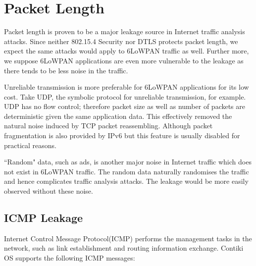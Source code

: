 \section{Packet Length}
Packet length is proven to be a major leakage source in Internet traffic analysis attacks. Since neither 802.15.4 Security nor DTLS protects packet length, we expect the same attacks would apply to 6LoWPAN traffic as well. Further more, we suppose 6LoWPAN applications are even more vulnerable to the leakage as there tends to be less noise in the traffic.

Unreliable transmission is more preferable for 6LoWPAN applications for its low cost. Take UDP, the symbolic protocol for unreliable transmission, for example. UDP has no flow control; therefore packet size as well as number of packets are deterministic given the same application data. This effectively removed the natural noise induced by TCP packet reassembling. Although packet fragmentation is also provided by IPv6 but this feature is usually disabled for practical reasons.

``Random" data, such as ads, is another major noise in Internet traffic which does not exist in 6LoWPAN traffic. The random data naturally randomises the traffic and hence complicates traffic analysis attacks. The leakage would be more easily observed without these noise.
\subsection{ICMP Leakage}


Internet Control Message Protocol(ICMP)\cite{rfc4443} performs the management tasks in the network, such as link establishment and routing information exchange. Contiki OS supports the following ICMP messages:

